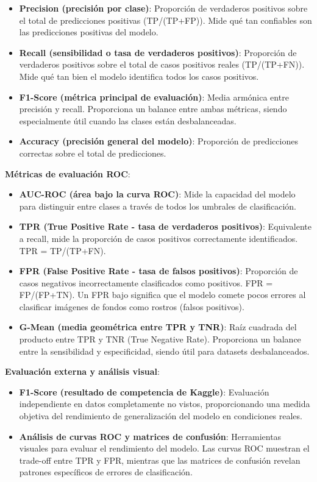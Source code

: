 \documentclass{article}
\begin{document}
\begin{itemize}
    \item \textbf{Precision (precisión por clase)}: Proporción de verdaderos positivos sobre el total de predicciones positivas (TP/(TP+FP)). Mide qué tan confiables son las predicciones positivas del modelo.
    \item \textbf{Recall (sensibilidad o tasa de verdaderos positivos)}: Proporción de verdaderos positivos sobre el total de casos positivos reales (TP/(TP+FN)). Mide qué tan bien el modelo identifica todos los casos positivos.
    \item \textbf{F1-Score (métrica principal de evaluación)}: Media armónica entre precisión y recall. Proporciona un balance entre ambas métricas, siendo especialmente útil cuando las clases están desbalanceadas.
    \item \textbf{Accuracy (precisión general del modelo)}: Proporción de predicciones correctas sobre el total de predicciones.
\end{itemize}

\textbf{Métricas de evaluación ROC}:
\begin{itemize}
    \item \textbf{AUC-ROC (área bajo la curva ROC)}: Mide la capacidad del modelo para distinguir entre clases a través de todos los umbrales de clasificación.
    \item \textbf{TPR (True Positive Rate - tasa de verdaderos positivos)}: Equivalente a recall, mide la proporción de casos positivos correctamente identificados. TPR = TP/(TP+FN).
    \item \textbf{FPR (False Positive Rate - tasa de falsos positivos)}: Proporción de casos negativos incorrectamente clasificados como positivos. FPR = FP/(FP+TN). Un FPR bajo significa que el modelo comete pocos errores al clasificar imágenes de fondos como rostros (falsos positivos).
    \item \textbf{G-Mean (media geométrica entre TPR y TNR)}: Raíz cuadrada del producto entre TPR y TNR (True Negative Rate). Proporciona un balance entre la sensibilidad y especificidad, siendo útil para datasets desbalanceados.
\end{itemize}

\textbf{Evaluación externa y análisis visual}:
\begin{itemize}
    \item \textbf{F1-Score (resultado de competencia de Kaggle)}: Evaluación independiente en datos completamente no vistos, proporcionando una medida objetiva del rendimiento de generalización del modelo en condiciones reales.
    \item \textbf{Análisis de curvas ROC y matrices de confusión}: Herramientas visuales para evaluar el rendimiento del modelo. Las curvas ROC muestran el trade-off entre TPR y FPR, mientras que las matrices de confusión revelan patrones específicos de errores de clasificación.
\end{itemize}
\end{document}
